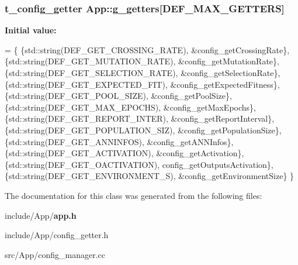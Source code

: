 \subsubsection[{g\+\_\+getters}]{\setlength{\rightskip}{0pt plus 5cm}t\+\_\+config\+\_\+getter App\+::g\+\_\+getters[D\+E\+F\+\_\+\+M\+A\+X\+\_\+\+G\+E\+T\+T\+E\+R\+S]\hspace{0.3cm}{\ttfamily [static]}}\label{class_app_ac62e6d975af3165aebcc6b4d790a390a}
{\bfseries Initial value\+:}
\begin{DoxyCode}
=
  \{
    \{std::string(DEF\_GET\_CROSSING\_RATE), &config\_getCrossingRate\},
    \{std::string(DEF\_GET\_MUTATION\_RATE), &config\_getMutationRate\},
    \{std::string(DEF\_GET\_SELECTION\_RATE), &config\_getSelectionRate\},
    \{std::string(DEF\_GET\_EXPECTED\_FIT), &config\_getExpectedFitness\},
    \{std::string(DEF\_GET\_POOL\_SIZE), &config\_getPoolSize\},
    \{std::string(DEF\_GET\_MAX\_EPOCHS), &config\_getMaxEpochs\},
    \{std::string(DEF\_GET\_REPORT\_INTER), &config\_getReportInterval\},
    \{std::string(DEF\_GET\_POPULATION\_SIZ), &config\_getPopulationSize\},
    \{std::string(DEF\_GET\_ANNINFOS), &config\_getANNInfos\},
    \{std::string(DEF\_GET\_ACTIVATION), &config\_getActivation\},
    \{std::string(DEF\_GET\_OACTIVATION), config\_getOutputsActivation\},
    \{std::string(DEF\_GET\_ENVIRONMENT\_S), &config\_getEnvironmentSize\}
  \}
\end{DoxyCode}


The documentation for this class was generated from the following files\+:\begin{DoxyCompactItemize}
\item 
include/\+App/{\bf app.\+h}\item 
include/\+App/config\+\_\+getter.\+h\item 
src/\+App/config\+\_\+manager.\+cc\end{DoxyCompactItemize}
